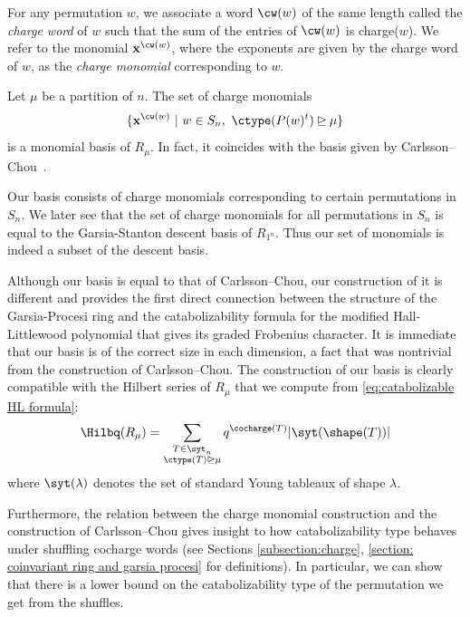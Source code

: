 For any permutation $w$, we associate a word $\cw(w)$ of the same length called the \textit{charge word} of $w$ such that the sum of the entries of $\cw(w)$ is charge($w$).
We refer to the monomial $\mathbf{x}^{\cw(w)}$, where the exponents are given by the charge word of $w$, as the \textit{charge monomial} corresponding to $w$.


\begin{thm1}
\makeatletter{}\makeatother
 Let $\mu$ be a partition of $n$.
     The set of charge monomials 
     \[ \{\mathbf{x}^{\cw(w)}\ | \ w\in S_n, \ \ctype(P(w)^t)\unrhd\mu\}\]
    is a monomial basis of $R_{\mu}$.
    In fact, it coincides with the basis given by Carlsson--Chou~\cite{CC}.
\end{thm1}

Our basis consists of charge monomials corresponding to certain permutations in $S_n$. We later see that the set of charge monomials for all permutations in $S_n$ is equal to the Garsia-Stanton descent basis of $R_{1^n}$. Thus our set of monomials is indeed a subset of the descent basis.  

Although our basis is equal to that of Carlsson--Chou, our construction of it is different and provides the first direct connection between the structure of the Garsia-Procesi ring and the catabolizability formula for the modified Hall-Littlewood polynomial that gives its graded Frobenius character. 
It is immediate that our basis is of the correct size in each dimension, a fact that was nontrivial from the construction of Carlsson--Chou. 
The construction of our basis is clearly compatible with the Hilbert series of $R_{\mu}$ that we compute from \eqref{eq:catabolizable HL formula}:
\begin{align}
    \Hilbq(R_{\mu})= \sum\limits_{\substack{T\in \syt_n\\  \ctype(T)\unrhd\mu}}  q^{\cocharge(T)} |\syt(\shape(T))|
\end{align}
where $\syt(\lambda)$ denotes the set of standard Young tableaux of shape $\lambda$.

Furthermore, the relation between the charge monomial construction and the construction of Carlsson--Chou gives insight to how catabolizability type behaves under shuffling cocharge words  (see Sections \ref{subsection:charge}, \ref{section: coinvariant ring and garsia procesi} for definitions). In particular, we can show that there is a lower bound on the catabolizability type of the permutation we get from the shuffles.

